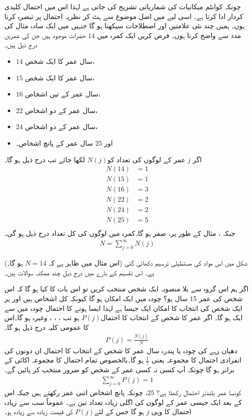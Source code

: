 چونکہ کوانٹم میکانیات کی شماریاتی تشریح کی جاتی ہے  لہٰذا  اس میں احتمال کلیدی کردار ادا کرتا ہے۔ اسی لیے میں اصل موضوع سے ہٹ کر  نظریہ احتمال پر تبصرہ کرتا ہوں۔ ہمیں چند نئی علامتیں  اور اصطلاحات سیکھنا ہو گا جنہیں میں ایک سادہ مثال کی مدد سے  واضح کرتا ہوں۔ 
فرض کریں ایک کمرہ   میں  \( 14 \)  حضرات موجود ہیں جن  کی  عمریں درج ذیل ہیں۔ 
\begin{itemize}
\item
 \( 14 \) سال عمر کا ایک شخص، 
\item
 \( 15 \) سال عمر کا ایک شخص، 
\item
 \( 16 \) سال عمر کے تین اشخاص، 
\item
 \( 22 \) سال عمر کے دو اشخاص، 
\item
 \( 24 \) سال عمر کے دو اشخاص، 
\item
 اور  \( 25 \) سال عمر کے پانچ  اشخاص۔
\end{itemize} 
اگر  \( j \)  عمر  کے لوگوں کی  تعداد  کو\( N(j) \) لکھا جائے تب درج ذیل ہو گا۔
\begin{align*}
N(14) &= 1 \\
N(15) &= 1 \\
N(16) &= 3 \\
N(22) &= 2 \\
N(24) &= 2 \\
N(25) &= 5 \\
\end{align*}
جبکہ ، مثال کے طور پر، صفر ہو گا۔کمرہ میں لوگوں کی کل تعداد درج ذیل ہو گی۔ 
\begin{align}
N = \sum_{j=0}^{\infty} N(j)
\end{align}

(اس مثال میں ظاہر ہے کہ \( N=14 \) ہو گا۔)  شکل میں اس مواد کی مستطیلی ترسیم دکھائی  گئی ہے۔ اس تقسیم کے بارے میں  درج ذیل چند ممکنہ سوالات ہیں۔ 

\quad
اگر ہم اس گروہ سے بلا منصوبہ ایک شخص منتخب کریں تو اس بات کا کیا  ہو گا کہ اس شخص کی عمر 15 سال ہو؟
\quad
چودہ میں ایک امکان  ہو گا کیونکہ کل   اشخاص ہیں اور ہر ایک شخص کی انتخاب کا امکان ایک جیسا ہے لہٰذا ایسا ہونے کا احتمال چودہ میں سے ایک ہو گا۔  اگر   عمر کا شخص کے انتخاب کا احتمال\( P(j) \) ہو تب ، ، ، وغیرہ ہو گا۔اس کا عمومی کلیہ درج ذیل ہو گا۔
\begin{align}
P(j) = \frac{N(j)}{N} 
\end{align}
دھیان رہے کی چودہ یا پندرہ سال عمر کا شخص کے انتخاب کا احتمال ان دونوں کی انفرادی احتمال کا مجموعہ یعنی \( \frac{1}{7} \) ہو گا۔بالخصوص تمام احتمال کا مجموعہ اکائی  کے برابر ہو گا چونکہ آپ کسی نہ کسی عمر کے شخص کو ضرور منتخب کر پائیں گے۔ 
\begin{align}\label{مساوات_تفاعل_موج_کل_احتمال_اکائی}
\sum_{j=0}^{\infty} P(j) = 1
\end{align}
\quad
کونسا عمر بلندتر احتمال رکھتا ہے؟
 \quad 
\( 25 \)،  چونکہ پانچ اشخاص اتنی عمر رکھتے ہیں جبکہ اس کے بعد ایک جیسی عمر کے لوگوں کی اگلی زیادہ  تعداد تین ہے۔ عموماً سب سے زیادہ احتمال کا  وہی \( j \) ہو گا جس کے لئے\( P(j) \) کی قیمت زیادہ سے زیادہ ہو۔ 

